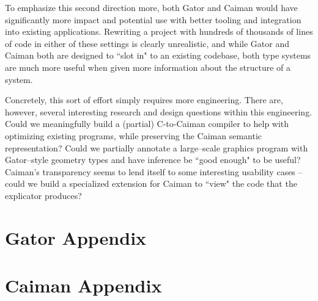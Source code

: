 \documentclass[phd,tocprelim]{cornell}
\begin{document}
To emphasize this second direction more, both Gator and Caiman would have significantly more impact and potential use with better tooling and integration into existing applications.  Rewriting a project with hundreds of thousands of lines of code in either of these settings is clearly unrealistic, and while Gator and Caiman both are designed to ``slot in" to an existing codebase, both type systems are much more useful when given more information about the structure of a system.

Concretely, this sort of effort simply requires more engineering.  There are, however, several interesting research and design questions within this engineering.  Could we meaningfully build a (partial) C-to-Caiman compiler to help with optimizing existing programs, while preserving the Caiman semantic representation?  Could we partially annotate a large--scale graphics program with Gator--style geometry types and have inference be ``good enough" to be useful?  Caiman's transparency seems to lend itself to some interesting usability cases -- could we build a specialized extension for Caiman to ``view" the code that the explicator produces?

\appendix

\chapter{Gator Appendix}


\chapter{Caiman Appendix}



\end{document}

